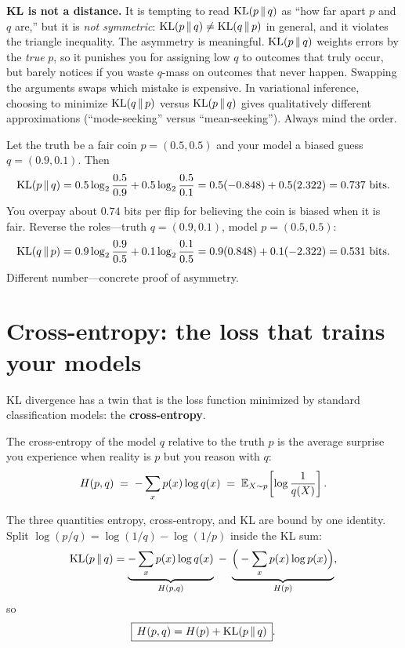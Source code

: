 \begin{trapbox}
\textbf{KL is not a distance.} It is tempting to read $\operatorname{KL}(p\,\|\,q)$ as ``how far apart $p$ and $q$ are,''
but it is \emph{not symmetric}: $\operatorname{KL}(p\,\|\,q) \ne \operatorname{KL}(q\,\|\,p)$ in general, and it violates the triangle
inequality. The asymmetry is meaningful. $\operatorname{KL}(p\,\|\,q)$ weights errors by the \emph{true}
$p$, so it punishes you for assigning low $q$ to outcomes that truly occur, but barely notices if you waste
$q$-mass on outcomes that never happen. Swapping the arguments swaps which mistake is expensive. In
variational inference, choosing to minimize $\operatorname{KL}(q\,\|\,p)$ versus $\operatorname{KL}(p\,\|\,q)$ gives qualitatively
different approximations (``mode-seeking'' versus ``mean-seeking''). Always mind the order.
\end{trapbox}

\begin{example}
\label{ch33:kl-coins}
Let the truth be a fair coin $p = (0.5, 0.5)$ and your model a biased guess $q = (0.9, 0.1)$. Then
\[
  \operatorname{KL}(p\,\|\,q) = 0.5\log_2\frac{0.5}{0.9} + 0.5\log_2\frac{0.5}{0.1}
               = 0.5(-0.848) + 0.5(2.322) = 0.737 \text{ bits.}
\]
You overpay about $0.74$ bits per flip for believing the coin is biased when it is fair. Reverse the
roles---truth $q = (0.9,0.1)$, model $p = (0.5,0.5)$:
\[
  \operatorname{KL}(q\,\|\,p) = 0.9\log_2\frac{0.9}{0.5} + 0.1\log_2\frac{0.1}{0.5}
               = 0.9(0.848) + 0.1(-2.322) = 0.531 \text{ bits.}
\]
Different number---concrete proof of asymmetry.
\end{example}

\section{Cross-entropy: the loss that trains your models}
\label{ch33:cross-entropy}

KL divergence has a twin that is the loss function minimized by standard classification models: the \textbf{cross-entropy}.

\begin{definition}
\label{ch33:def-cross-entropy}
The cross-entropy of the model $q$ relative to the truth $p$ is the average surprise you experience when
reality is $p$ but you reason with $q$:
\[
  H(p, q) \;=\; -\sum_x p(x)\log q(x) \;=\; \operatorname{\mathbb{E}}_{X\sim p}\!\left[\log\frac{1}{q(X)}\right].
\]
\end{definition}

The three quantities entropy, cross-entropy, and KL are bound by one identity. Split
$\log(p/q) = \log(1/q) - \log(1/p)$ inside the KL sum:
\[
  \operatorname{KL}(p\,\|\,q) = \underbrace{-\sum_x p(x)\log q(x)}_{H(p,q)} \;-\; \underbrace{\Big(-\sum_x p(x)\log p(x)\Big)}_{H(p)},
\]
so
\[
  \boxed{\,H(p, q) = H(p) + \operatorname{KL}(p \,\|\, q)\,}.
\]

